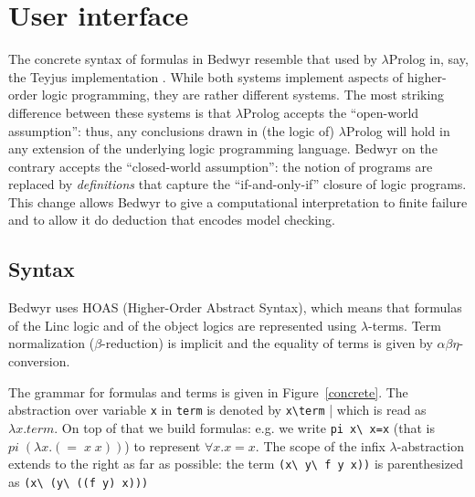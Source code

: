 \documentclass{article}
\begin{document}
\section{User interface}
\label{sec:interface}

The concrete syntax of formulas in Bedwyr resemble that used by
$\lambda$Prolog in, say, the Teyjus implementation
\cite{nadathur99cade}.  While both systems implement aspects of
higher-order logic programming, they are rather different systems.
The most striking difference between these systems is that
$\lambda$Prolog accepts the ``open-world assumption'': thus, any
conclusions drawn in (the logic of) $\lambda$Prolog will hold in any
extension of the underlying logic programming language.  Bedwyr on the
contrary accepts the ``closed-world assumption'': the notion of
programs are replaced by {\em definitions} that capture the
``if-and-only-if'' closure of logic programs.  This change allows
Bedwyr to give a computational interpretation to finite failure and to
allow it do deduction that encodes model checking.

\subsection{Syntax}

Bedwyr uses HOAS (Higher-Order Abstract Syntax), which means that
formulas of the Linc logic and of the object logics are represented
using $\lambda$-terms. Term normalization ($\beta$-reduction) is
implicit and the equality of terms is given by
$\alpha\beta\eta$-conversion.

The grammar for formulas and terms is given in Figure~\ref{concrete}.
The abstraction over variable \verb.x. in \verb.term. is denoted by
\verb.x\term. | which is read as $\lambda x. term$. On top of that we
build formulas: e.g. we write \verb.pi x\ x=x.  (that is
$pi\;(\lambda{}x.(=\;x\;x))$) to represent $\forall x. x=x$.  The
scope of the infix $\lambda$-abstraction extends to the right as far
as possible: the term \verb.(x\ y\ f y x)). is parenthesized as 
\verb.(x\ (y\ ((f y) x))).
\end{document}
